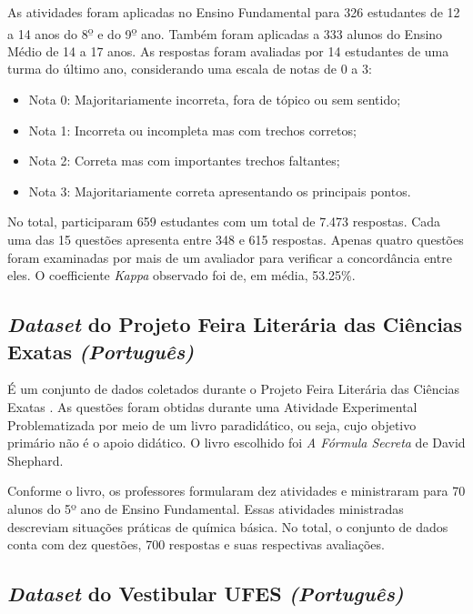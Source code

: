 As atividades foram aplicadas no Ensino Fundamental para 326 estudantes de 12 a 14 anos do 8\textsuperscript{\b{o}} e do 9\textsuperscript{\b{o}} ano. Também foram aplicadas a 333 alunos do Ensino Médio de 14 a 17 anos. As respostas foram avaliadas por 14 estudantes de uma turma do último ano, considerando uma escala de notas de 0 a 3:

\begin{itemize}
\item Nota 0: Majoritariamente incorreta, fora de tópico ou sem sentido;
\item Nota 1: Incorreta ou incompleta mas com trechos corretos;
\item Nota 2: Correta mas com importantes trechos faltantes;
\item Nota 3: Majoritariamente correta apresentando os principais pontos.
\end{itemize}

No total, participaram 659 estudantes com um total de 7.473 respostas. Cada uma das 15 questões apresenta entre 348 e 615 respostas. Apenas quatro questões foram examinadas por mais de um avaliador para verificar a concordância entre eles. O coefficiente \textit{Kappa} observado foi de, em média, 53.25\%.


\subsection{\textit{Dataset} do Projeto Feira Literária das Ciências Exatas \textit{(Português)}}
\label{findes-db}

É um conjunto de dados coletados durante o Projeto Feira Literária das Ciências Exatas \cite{nascimento2020}. As questões foram obtidas durante uma Atividade Experimental Problematizada por meio de um livro paradidático, ou seja, cujo objetivo primário não é o apoio didático. O livro escolhido foi \textit{A Fórmula Secreta} de David Shephard. 

Conforme o livro, os professores formularam dez atividades e ministraram para 70 alunos do 5º ano de Ensino Fundamental. Essas atividades ministradas descreviam situações práticas de química básica. No total, o conjunto de dados conta com dez questões, 700 respostas e suas respectivas avaliações.


\subsection{\textit{Dataset} do Vestibular UFES \textit{(Português)}}
\label{vest-ufes-db}

